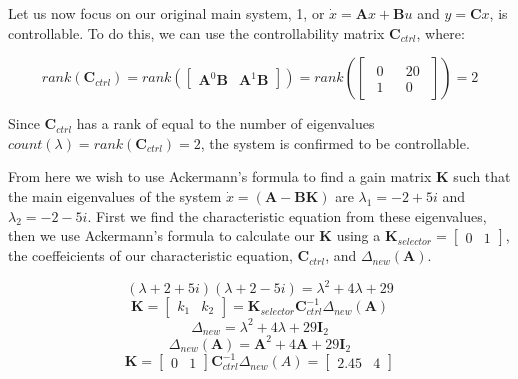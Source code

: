 \documentclass{article}
\begin{document}
Let us now focus on our original main system, 1, or $\dot{x}=\boldsymbol{A}x+\boldsymbol{B}u$ and $y=\boldsymbol{C}x$, is controllable. To do this, we can use the controllability matrix $\boldsymbol{C}_{ctrl}$, where:

\begin{equation}
    rank(\boldsymbol{C}_{ctrl}) = rank(\begin{bmatrix}
        \boldsymbol{A}^0\boldsymbol{B} & \boldsymbol{A}^1\boldsymbol{B}
    \end{bmatrix}) = rank(\begin{bmatrix}
        \begin{matrix}
            0 \\ 1
        \end{matrix} &
        \begin{matrix}
            20 \\ 0
        \end{matrix}
    \end{bmatrix}) = 2
\end{equation}

Since $\boldsymbol{C}_{ctrl}$ has a rank of equal to the number of eigenvalues $count(\lambda)=rank(\boldsymbol{C}_{ctrl})=2$, the system is confirmed to be controllable.

From here we wish to use Ackermann's formula to find a gain matrix $\boldsymbol{K}$ such that the main eigenvalues of the system $\dot{x}=(\boldsymbol{A}-\boldsymbol{B}\boldsymbol{K})$ are $\lambda_1 = -2+5i$ and $\lambda_2 = -2-5i$. First we find the characteristic equation from these eigenvalues, then we use Ackermann's formula to calculate our $\boldsymbol{K}$ using a $\boldsymbol{K}_{selector}=\begin{bmatrix}0 & 1\end{bmatrix}$, the coeffeicients of our characteristic equation, $\boldsymbol{C}_{ctrl}$, and $\Delta_{new}(\boldsymbol{A})$.


\begin{equation}
    (\lambda+2+5i)(\lambda+2-5i) = \lambda^2 + 4\lambda+29
\end{equation}
\begin{equation}
    \boldsymbol{K} = \begin{bmatrix}k_1 & k_2 \end{bmatrix} = \boldsymbol{K}_{selector} \boldsymbol{C}_{ctrl}^{-1} \Delta_{new}(\boldsymbol{A})
\end{equation}
\begin{equation}
    \Delta_{new} = \lambda^2 + 4\lambda+29\boldsymbol{I}_2
\end{equation}
\begin{equation}
    \Delta_{new}(\boldsymbol{A}) = \boldsymbol{A}^2+4\boldsymbol{A}+29\boldsymbol{I}_2
\end{equation}
\begin{equation}
    \boldsymbol{K} = \begin{bmatrix}0 & 1\end{bmatrix} \boldsymbol{C}_{ctrl}^{-1} \Delta_{new}(A) = \begin{bmatrix}
        2.45 & 4
    \end{bmatrix}
\end{equation}
\end{document}
